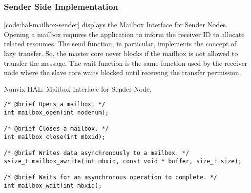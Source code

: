 			\subsubsection{Sender Side Implementation}


				\autoref{code:hal-mailbox-sender} displays the Mailbox Interface for
				Sender Nodes. Opening a mailbox requires the application to inform
				the receiver ID to allocate related resources. The send function,
				in particular, implements the concept of lazy transfer. So, the master
				core never blocks if the mailbox is not allowed to transfer the message.
				The wait function is the same function used by the receiver node where
				the slave core waits blocked until receiving the transfer permission.


\begin{listing}[!tb]
\caption{Nanvix HAL: Mailbox Interface for Sender Node.}
\label{code:hal-mailbox-sender}
\begin{verbatim}
/* @brief Opens a mailbox. */
int mailbox_open(int nodenum);

/* @brief Closes a mailbox. */
int mailbox_close(int mbxid);

/* @brief Writes data asynchronously to a mailbox. */
ssize_t mailbox_awrite(int mbxid, const void * buffer, size_t size);

/* @brief Waits for an asynchronous operation to complete. */
int mailbox_wait(int mbxid);
\end{verbatim}
\end{listing}

